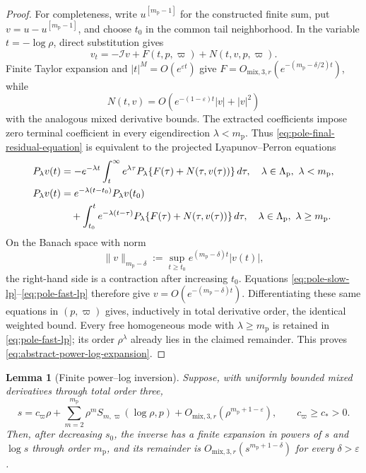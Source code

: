 \documentclass[11pt]{amsart}
\numberwithin{equation}{section}
\newtheorem{lemma}[theorem]{Lemma}
\theoremstyle{definition}
\theoremstyle{remark}
\begin{document}
\begin{proof}
For completeness, write $u^{[m_{\mathrm p}-1]}$ for the constructed
finite sum, put $v=u-u^{[m_{\mathrm p}-1]}$, and choose $t_0$ in the common tail
neighborhood.  In the variable $t=-\log\rho$, direct substitution gives
\begin{equation}\label{eq:pole-final-residual-equation}
 v_t=-\mathcal I v+F(t,p,\varpi)+N(t,v,p,\varpi).
\end{equation}
Finite Taylor expansion and $|t|^M=O(e^{\varepsilon t})$ give
$F=O_{\mathrm{mix},3,r}
   (e^{-(m_{\mathrm p}-\delta/2)t})$, while
\[
 N(t,v)=O(e^{-(1-\varepsilon)t}|v|+|v|^2)
\]
with the analogous mixed derivative bounds.  The extracted coefficients
impose zero terminal coefficient in every eigendirection
$\lambda<m_{\mathrm p}$.  Thus
\eqref{eq:pole-final-residual-equation} is equivalent to the projected
Lyapunov--Perron equations
\begin{align}
 P_\lambda v(t)&=-e^{-\lambda t}\int_t^\infty e^{\lambda\tau}
          P_\lambda\{F(\tau)+N(\tau,v(\tau))\}\,d\tau,
          \quad \lambda\in\Lambda_{\mathrm p},\ \lambda<m_{\mathrm p},
          \label{eq:pole-slow-lp}\\
 P_\lambda v(t)&=e^{-\lambda(t-t_0)}P_\lambda v(t_0)
   \notag\\
  &\quad+\int_{t_0}^te^{-\lambda(t-\tau)}
          P_\lambda\{F(\tau)+N(\tau,v(\tau))\}\,d\tau,
          \quad \lambda\in\Lambda_{\mathrm p},\ \lambda\ge m_{\mathrm p}.
          \label{eq:pole-fast-lp}
\end{align}
On the Banach space with norm
\[
 \|v\|_{m_{\mathrm p}-\delta}
 :=\sup_{t\ge t_0}e^{(m_{\mathrm p}-\delta)t}|v(t)|,
\]
the right-hand side is a
contraction after increasing $t_0$.  Equations
\eqref{eq:pole-slow-lp}--\eqref{eq:pole-fast-lp} therefore give
$v=O(e^{-(m_{\mathrm p}-\delta)t})$.  Differentiating these same equations in
$(p,\varpi)$ gives, inductively in total derivative order, the identical
weighted bound.  Every free homogeneous mode with
$\lambda\ge m_{\mathrm p}$ is retained in
\eqref{eq:pole-fast-lp}; its order $\rho^\lambda$ already lies in the
claimed remainder.  This proves \eqref{eq:abstract-power-log-expansion}.
\end{proof}

\begin{lemma}[Finite power--log inversion]
\label{lem:power-log-inversion}
Suppose, with uniformly bounded mixed derivatives through total order
three,
\begin{equation}\label{eq:power-log-map}
 s=c_\varpi\rho+
   \sum_{m=2}^{m_{\mathrm p}}\rho^mS_{m,\varpi}(\log\rho,p)
   +O_{\mathrm{mix},3,r}
      (\rho^{m_{\mathrm p}+1-\varepsilon}),
 \qquad c_\varpi\ge c_*>0.
\end{equation}
Then, after decreasing $s_0$, the inverse has a finite expansion in powers
of $s$ and $\log s$ through order $m_{\mathrm p}$, and its remainder is
$O_{\mathrm{mix},3,r}(s^{m_{\mathrm p}+1-\delta})$ for every
$\delta>\varepsilon$.
\end{lemma}
\end{document}
